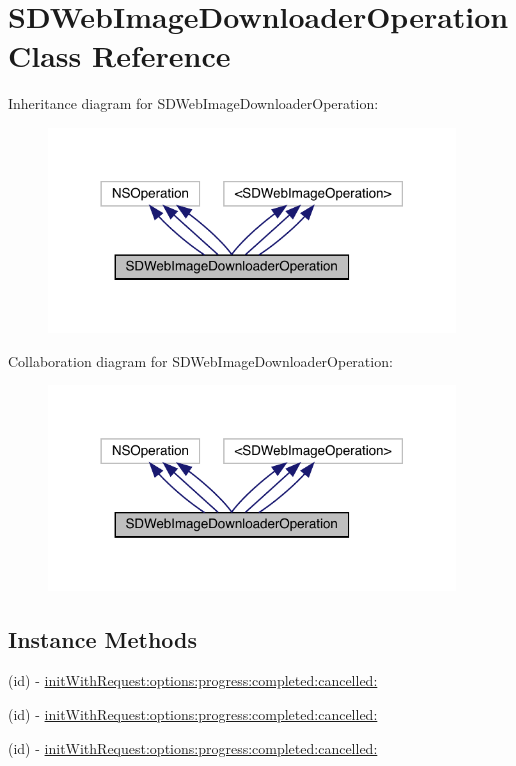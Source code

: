 \hypertarget{interface_s_d_web_image_downloader_operation}{}\section{S\+D\+Web\+Image\+Downloader\+Operation Class Reference}
\label{interface_s_d_web_image_downloader_operation}


Inheritance diagram for S\+D\+Web\+Image\+Downloader\+Operation\+:\nopagebreak
\begin{figure}[H]
\begin{center}
\leavevmode
\includegraphics[width=306pt]{interface_s_d_web_image_downloader_operation__inherit__graph}
\end{center}
\end{figure}


Collaboration diagram for S\+D\+Web\+Image\+Downloader\+Operation\+:\nopagebreak
\begin{figure}[H]
\begin{center}
\leavevmode
\includegraphics[width=306pt]{interface_s_d_web_image_downloader_operation__coll__graph}
\end{center}
\end{figure}
\subsection*{Instance Methods}
\begin{DoxyCompactItemize}
\item 
(id) -\/ \mbox{\hyperlink{interface_s_d_web_image_downloader_operation_af876b06c8170561e050278aec0460cb2}{init\+With\+Request\+:options\+:progress\+:completed\+:cancelled\+:}}
\item 
(id) -\/ \mbox{\hyperlink{interface_s_d_web_image_downloader_operation_af876b06c8170561e050278aec0460cb2}{init\+With\+Request\+:options\+:progress\+:completed\+:cancelled\+:}}
\item 
(id) -\/ \mbox{\hyperlink{interface_s_d_web_image_downloader_operation_af876b06c8170561e050278aec0460cb2}{init\+With\+Request\+:options\+:progress\+:completed\+:cancelled\+:}}
\end{DoxyCompactItemize}
